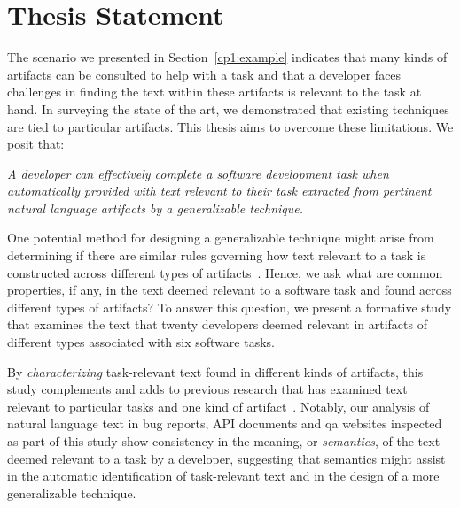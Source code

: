 

\section{Thesis Statement}
\label{cp1:thesis}





The scenario we presented in Section~\ref{cp1:example}
 indicates that many kinds of 
artifacts can be consulted to help 
with a task and that a developer faces challenges in finding the text within these 
artifacts is relevant to the task at hand. 
In surveying the state of the art, we demonstrated that existing techniques are tied to particular
artifacts. This thesis aims to overcome these limitations. We posit that:



\bigskip
\begin{bluequote}
    \textit{A developer can effectively complete a software development task when automatically provided with text relevant to their task extracted from pertinent natural language artifacts
    by a generalizable technique.}
\end{bluequote}
\medskip



One potential method for designing a generalizable technique 
might arise from 
determining if there are similar rules governing how text relevant to a task is 
constructed across different types of artifacts~\cite{Kintsch1978a}.
Hence, we ask what are common properties, if any, in the text deemed relevant 
to a software task and found across different types of artifacts?
To answer this question, we present a formative study that 
examines the text that twenty developers deemed relevant in artifacts 
of different types associated with six software tasks.


By \textit{characterizing} task-relevant text found in different kinds of artifacts,
this study complements and adds to previous research that has
examined text relevant to particular tasks and one kind of artifact~\cite{Ko2006, Rastkar2010, Chaparro2017, Robillard2015}.
Notably, our analysis of natural language text  in bug
reports, API documents and \ac{qa} websites 
inspected as part of this study 
 show consistency in the meaning, or \textit{semantics}, of the
 text deemed relevant to a task by a developer, suggesting that 
semantics might assist in the automatic identification of
task-relevant text and in the design of a more generalizable technique.




